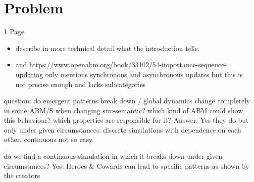 \section{Problem}
1 Page

\begin{itemize}
	\item describe in more technical detail what the introduction tells.
	\item \cite{huberman_evolutionary_1993} and \url{https://www.openabm.org/book/33102/54-importance-sequence-updating} only mentions synchronous and asynchronous updates but this is not precise enough and lacks subcategories
\end{itemize}

question: do emergent patterns break down / global dynamics change completely in some ABM/S when changing sim-semantic? which kind of ABM could show this behaviour? which properties are responsible for it? Answer: Yes they do but only under given circumstances: discrete simulations with dependence on each other. continuous not so easy. 
		
do we find a continuous simulation in which it breaks down under given circumstances? Yes: Heroes \& Cowards can lead to specific patterns as shown by the creators

